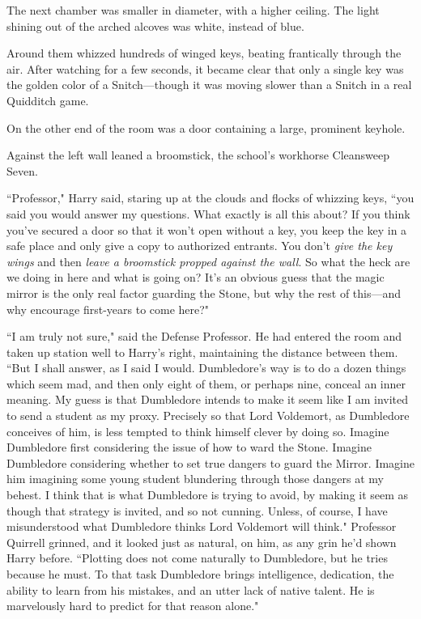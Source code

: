 \later

The next chamber was smaller in diameter, with a higher ceiling. The light shining out of the arched alcoves was white, instead of blue.

Around them whizzed hundreds of winged keys, beating frantically through the air. After watching for a few seconds, it became clear that only a single key was the golden color of a Snitch—though it was moving slower than a Snitch in a real Quidditch game.

On the other end of the room was a door containing a large, prominent keyhole.

Against the left wall leaned a broomstick, the school's workhorse Cleansweep Seven.

``Professor," Harry said, staring up at the clouds and flocks of whizzing keys, ``you said you would answer my questions. What exactly is all this about? If you think you've secured a door so that it won't open without a key, you keep the key in a safe place and only give a copy to authorized entrants. You don't \emph{give the key wings} and then \emph{leave a broomstick propped against the wall}. So what the heck are we doing in here and what is going on? It's an obvious guess that the magic mirror is the only real factor guarding the Stone, but why the rest of this—and why encourage first-years to come here?"

``I am truly not sure," said the Defense Professor. He had entered the room and taken up station well to Harry's right, maintaining the distance between them. ``But I shall answer, as I said I would. Dumbledore's way is to do a dozen things which seem mad, and then only eight of them, or perhaps nine, conceal an inner meaning. My guess is that Dumbledore intends to make it seem like I am invited to send a student as my proxy. Precisely so that Lord Voldemort, as Dumbledore conceives of him, is less tempted to think himself clever by doing so. Imagine Dumbledore first considering the issue of how to ward the Stone. Imagine Dumbledore considering whether to set true dangers to guard the Mirror. Imagine him imagining some young student blundering through those dangers at my behest. I think that is what Dumbledore is trying to avoid, by making it seem as though that strategy is invited, and so not cunning. Unless, of course, I have misunderstood what Dumbledore thinks Lord Voldemort will think." Professor Quirrell grinned, and it looked just as natural, on him, as any grin he'd shown Harry before. ``Plotting does not come naturally to Dumbledore, but he tries because he must. To that task Dumbledore brings intelligence, dedication, the ability to learn from his mistakes, and an utter lack of native talent. He is marvelously hard to predict for that reason alone."

